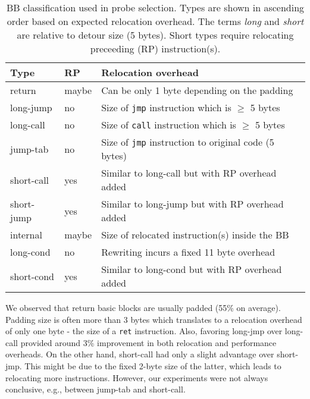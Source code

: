 \begin{table}[t!]
    \centering
    \renewcommand{\arraystretch}{1.2}
    \setlength\tabcolsep{4pt}
    \small
    \caption{BB classification used in probe selection. Types are shown in ascending order based on expected relocation overhead. 
    The terms \textit{long} and \textit{short }are relative to detour size (5 bytes).
    Short types require relocating preceeding (RP) instruction(s).
    } 
    \label{tab:probe-overhead}    
    \begin{tabularx}{\columnwidth}{@{}lll@{}}
        \\
        \textbf{Type} &
        \textbf{RP} &
        \textbf{Relocation overhead} \\
        
        \toprule
        
        \textsf{return} & maybe & Can be only 1 byte depending on the padding \\
        \textsf{long-jump} & no & Size of \texttt{jmp} instruction which is $ \ge $ 5 bytes \\
        \textsf{long-call} & no & Size of \texttt{call} instruction which is $ \ge $ 5 bytes  \\
        \textsf{jump-tab} & no & Size of \texttt{jmp} instruction to original code (5 bytes)  \\
        \textsf{short-call} & yes & Similar to \textsf{long-call} but with RP overhead added \\
        \textsf{short-jump} & yes &Similar to \textsf{long-jump} but with RP overhead added\\
        \textsf{internal} & maybe & Size of relocated instruction(s) inside the BB \\
        \textsf{long-cond} & no & Rewriting incurs a fixed 11 byte overhead\\
        \textsf{short-cond} & yes & Similar to \textsf{long-cond} but with RP overhead added\\
        \bottomrule
    \end{tabularx}
\end{table}


%


We observed that \textsf{return} basic blocks are usually padded (55\% on average).
Padding size is often more than 3 bytes which translates to a relocation overhead of only one byte - the size of a  \texttt{ret} instruction.
Also, favoring \textsf{long-jmp} over \textsf{long-call} provided around 3\% improvement in both relocation and performance overheads.
On the other hand, \textsf{short-call} had only a slight advantage over \textsf{short-jmp}.
This might be due to the fixed 2-byte size of the latter, which leads to relocating more instructions.
However, our experiments were not always conclusive, e.g., between \textsf{jump-tab} and \textsf{short-call}.

